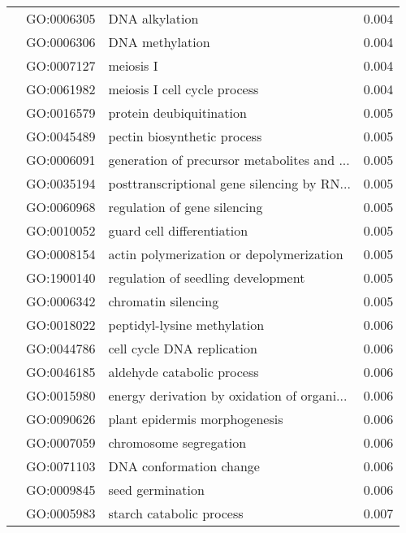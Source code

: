 \begin{longtable}{lllr}
   & GO:0006305 &                               DNA alkylation &         0.004 \\
   & GO:0006306 &                              DNA methylation &         0.004 \\
   & GO:0007127 &                                    meiosis I &         0.004 \\
   & GO:0061982 &                 meiosis I cell cycle process &         0.004 \\
   & GO:0016579 &                     protein deubiquitination &         0.005 \\
   & GO:0045489 &                  pectin biosynthetic process &         0.005 \\
   & GO:0006091 &  generation of precursor metabolites and ... &         0.005 \\
   & GO:0035194 &  posttranscriptional gene silencing by RN... &         0.005 \\
   & GO:0060968 &                 regulation of gene silencing &         0.005 \\
   & GO:0010052 &                   guard cell differentiation &         0.005 \\
   & GO:0008154 &     actin polymerization or depolymerization &         0.005 \\
   & GO:1900140 &           regulation of seedling development &         0.005 \\
   & GO:0006342 &                          chromatin silencing &         0.005 \\
   & GO:0018022 &                  peptidyl-lysine methylation &         0.006 \\
   & GO:0044786 &                   cell cycle DNA replication &         0.006 \\
   & GO:0046185 &                   aldehyde catabolic process &         0.006 \\
   & GO:0015980 &  energy derivation by oxidation of organi... &         0.006 \\
   & GO:0090626 &                plant epidermis morphogenesis &         0.006 \\
   & GO:0007059 &                       chromosome segregation &         0.006 \\
   & GO:0071103 &                      DNA conformation change &         0.006 \\
   & GO:0009845 &                             seed germination &         0.006 \\
   & GO:0005983 &                     starch catabolic process &         0.007 \\

\end{longtable}
